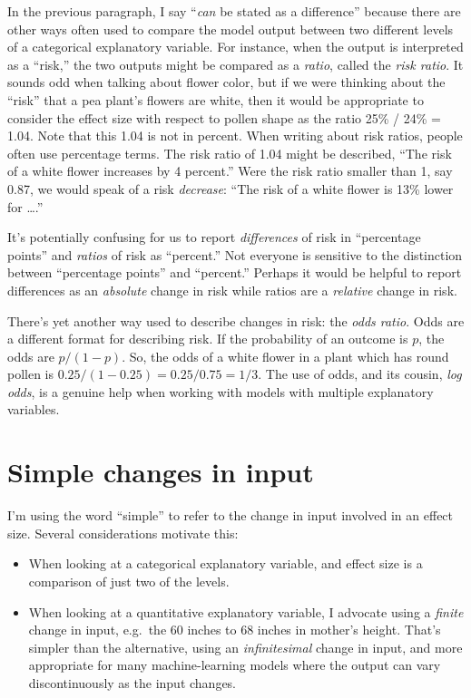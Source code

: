 \documentclass[]{tufte-book}
\providecommand{\tightlist}{%
  \setlength{\itemsep}{0pt}\setlength{\parskip}{0pt}}
\begin{document}
In the previous paragraph, I say ``\emph{can} be stated as a difference'' because there are other ways often used to compare the model output between two different levels of a categorical explanatory variable. For instance, when the output is interpreted as a ``risk,'' the two outputs might be compared as a \emph{ratio}, called the \emph{risk ratio}. It sounds odd when talking about flower color, but if we were thinking about the ``risk'' that a pea plant's flowers are white, then it would be appropriate to consider the effect size with respect to pollen shape as the ratio 25\% / 24\% = 1.04. Note that this 1.04 is not in percent. When writing about risk ratios, people often use percentage terms. The risk ratio of 1.04 might be described, ``The risk of a white flower increases by 4 percent.'' Were the risk ratio smaller than 1, say 0.87, we would speak of a risk \emph{decrease}: ``The risk of a white flower is 13\% lower for \ldots{}.''

It's potentially confusing for us to report \emph{differences} of risk in ``percentage points'' and \emph{ratios} of risk as ``percent.'' Not everyone is sensitive to the distinction between ``percentage points'' and ``percent.'' Perhaps it would be helpful to report differences as an \emph{absolute} change in risk while ratios are a \emph{relative} change in risk.

There's yet another way used to describe changes in risk: the \emph{odds ratio}. Odds are a different format for describing risk. If the probability of an outcome is \(p\), the odds are \(p/(1-p)\). So, the odds of a white flower in a plant which has round pollen is \(0.25/(1-0.25) = 0.25 / 0.75 = 1/3\). The use of odds, and its cousin, \emph{log odds}, is a genuine help when working with models with multiple explanatory variables.

\hypertarget{simple-changes-in-input}{%
\section{Simple changes in input}\label{simple-changes-in-input}}

I'm using the word ``simple'' to refer to the change in input involved in an effect size. Several considerations motivate this:

\begin{itemize}
\tightlist
\item
  When looking at a categorical explanatory variable, and effect size is a comparison of just two of the levels.
\item
  When looking at a quantitative explanatory variable, I advocate using a \emph{finite} change in input, e.g.~the 60 inches to 68 inches in mother's height. That's simpler than the alternative, using an \emph{infinitesimal} change in input, and more appropriate for many machine-learning models where the output can vary discontinuously as the input changes.
\end{itemize}
\end{document}
